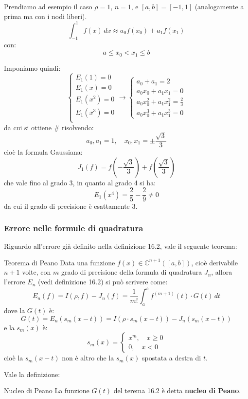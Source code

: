 \documentclass[a4paper,11pt]{article}
\begin{document}
Prendiamo ad esempio il caso $\rho = 1$, $n = 1$, e $[a, b] = [-1, 1]$ (analogamente a prima ma con i nodi liberi).
$$
\int_{-1}^1 f(x) \, dx \approx a_0 f(x_0) + a_1 f(x_1)
$$
con:
$$
a \leq x_0 < x_1 \leq b
$$

Imponiamo quindi:
\[
	\begin{cases}
		E_1(1) = 0 \\	
		E_1(x) = 0 \\	
		E_1(x^2) = 0 \\	
		E_1(x^3) = 0 \\	
	\end{cases}
	\rightarrow
	\begin{cases}
		a_0 + a_1 = 2 \\
		a_0 x_0 + a_1 x_1 = 0 \\
		a_0 x_0^2 + a_1 x_1^2 = \frac{2}{3} \\
		a_0 x_0^3 + a_1 x_1^3 = 0
	\end{cases}
\]
da cui si ottiene # risolvendo: 
$$
a_0, a_1 = 1, \quad x_0, x_1 = \pm \frac{\sqrt{3}}{3}
$$
cioè la formula Gaussiana:
$$
J_1(f) = f\left(-\frac{\sqrt{3}}{3}\right) + f\left(\frac{\sqrt{3}}{3}\right)
$$
che vale fino al grado 3, in quanto al grado 4 si ha:
$$
E_1(x^4) = \frac{2}{5} - \frac{2}{9} \neq 0
$$
da cui il grado di precisione è esattamente 3.

\subsubsection{Errore nelle formule di quadratura}
Riguardo all'errore già definito nella definizione 16.2, vale il seguente teorema:
\begin{theorem}{Teorema di Peano}
	Data una funzione $f(x) \in \mathbb{C}^{n + 1} \left([a, b]\right)$, cioè derivabile $n+1$ volte, con $m$ grado di precisione della formula di quadratura $J_n$, allora l'errore $E_n$ (vedi definizione 16.2) si può scrivere come:
	$$
		E_n(f) = I(\rho, f) - J_n(f) = \frac{1}{m!} \int_a^b f^{(m + 1)}(t) \cdot G(t) \, dt
	$$
	dove la $G(t)$ è:
	$$
		G(t) = E_n (s_m (x - t)) = I(\rho \cdot s_m(x - t)) - J_n (s_m(x - t))
	$$
	e la $s_m(x)$ è:
	$$
		s_m(x) = 
		\begin{cases}
			x^m, \quad x \geq 0 \\
			0, \quad x < 0
		\end{cases}
	$$
	cioè la $s_m(x - t)$ non è altro che la $s_m(x)$ spostata a destra di $t$.
\end{theorem}
Vale la definizione:
\begin{definition}{Nucleo di Peano}
	La funzione $G(t)$ del terema 16.2 è detta \textbf{nucleo di Peano}. 
\end{definition}
\end{document}
